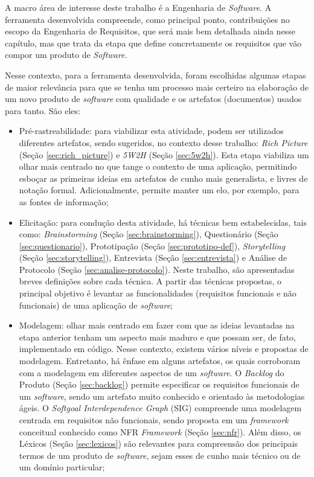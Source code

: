 A macro área de interesse deste trabalho é a Engenharia de \textit{Software}. A ferramenta desenvolvida compreende, como principal ponto, contribuições no escopo da Engenharia de Requisitos, que será mais bem detalhada ainda nesse capítulo, mas que trata da etapa que define concretamente os requisitos que vão compor um produto de \textit{Software}.

Nesse contexto, para a ferramenta desenvolvida, foram escolhidas algumas etapas de maior relevância para que se tenha um processo mais certeiro na elaboração de um novo produto de \textit{software} com qualidade e os artefatos (documentos) usados para tanto. São eles:

\begin{itemize}
    \item Pré-rastreabilidade: para viabilizar esta atividade, podem ser utilizados diferentes artefatos, sendo sugeridos, no contexto desse trabalho: \textit{Rich Picture} (Seção \ref{sec:rich_picture}) e \textit{5W2H} (Seção \ref{sec:5w2h}). Esta etapa viabiliza um olhar mais centrado no que tange o contexto de uma aplicação, permitindo esboçar as primeiras ideias em artefatos de cunho mais generalista, e livres de notação formal. Adicionalmente, permite manter um elo, por exemplo, para as fontes de informação;
    
    \item Elicitação: para condução desta atividade, há técnicas bem estabelecidas, tais como: \textit{Brainstorming} (Seção \ref{sec:brainstorming}), Questionário (Seção \ref{sec:questionario}), Prototipação (Seção \ref{sec:prototipo-def}), \textit{Storytelling} (Seção \ref{sec:storytelling}), Entrevista (Seção \ref{sec:entrevista}) e Análise de Protocolo (Seção \ref{sec:analise-protocolo}). Neste trabalho, são apresentadas breves definições sobre cada técnica. A partir das técnicas propostas, o principal objetivo é levantar as funcionalidades (requisitos funcionais e não funcionais) de uma aplicação de \textit{software};
    
    \item Modelagem: olhar mais centrado em fazer com que as ideias levantadas na etapa anterior tenham um aspecto mais maduro e que possam ser, de fato, implementado em código. Nesse contexto, existem vários níveis e propostas de modelagem. Entretanto, há ênfase em alguns artefatos, os quais corroboram com a modelagem em diferentes aspectos de um \textit{software}. O \textit{Backlog} do Produto (Seção \ref{sec:backlog}) permite especificar os requisitos funcionais de um \textit{software}, sendo um artefato muito conhecido e orientado às metodologias ágeis. O \textit{Softgoal Interdependence Graph} (SIG) compreende uma modelagem centrada em requisitos não funcionais, sendo proposta em um \textit{framework} conceitual conhecido como NFR \textit{Framework} (Seção \ref{sec:nfr}). Além disso, os Léxicos (Seção \ref{sec:lexicos}) são relevantes para compreensão dos principais termos de um produto de \textit{software}, sejam esses de cunho mais técnico ou de um domínio particular;
    

\end{itemize}
